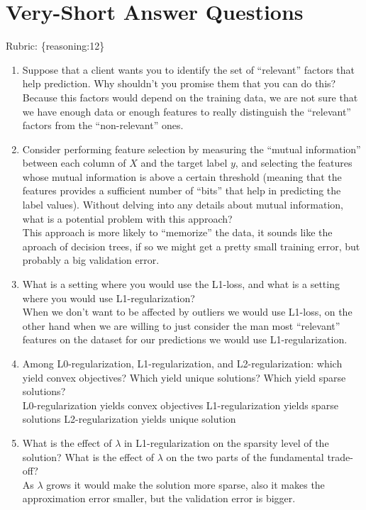 \documentclass{article}
\def\rubric#1{\gre{Rubric: \{#1\}}}{}
\def\gre#1{{\color{gre}#1}}
\def\ans#1{{\color{ans}#1}}
\def\enum#1{\begin{enumerate}#1\end{enumerate}}
\begin{document}
\section{Very-Short Answer Questions}
\rubric{reasoning:12}


\enum{
\item Suppose that a client wants you to identify the set of ``relevant'' factors that help prediction. Why shouldn't you promise them that you can do this? \\
\ans{
    Because this factors would depend on the training data, we are not sure that we have enough data or 
    enough features to really distinguish the ``relevant'' factors from the ``non-relevant'' ones.
}
\item Consider performing feature selection by measuring the ``mutual information'' between each column of $X$ and the target label $y$, and selecting the features whose mutual information is above a certain threshold (meaning that the features provides a sufficient number of ``bits'' that help in predicting the label values). Without delving into any details about mutual information, what is a potential problem with this approach? \\
\ans{
    This approach is more likely to ``memorize'' the data, it sounds like the aproach of decision trees, 
    if so we might get a pretty small training error, but probably a big validation error.
}
\item What is a setting where you would use the L1-loss, and what is a setting where you would use L1-regularization? \\
\ans{
    When we don't want to be affected by outliers we would use L1-loss, on the other hand when we 
    are willing to just consider the man most ``relevant'' features on the dataset for our predictions 
    we would use L1-regularization.
}
\item Among L0-regularization, L1-regularization, and L2-regularization: which yield convex objectives? Which yield unique solutions? Which yield sparse solutions? \\
\ans{
    L0-regularization yields convex objectives
    L1-regularization yields sparse solutions
    L2-regularization yields unique solution
}
\item What is the effect of $\lambda$ in L1-regularization on the sparsity level of the solution? What is the effect of $\lambda$ on the two parts of the fundamental trade-off? \\
\ans{
    As $\lambda$ grows it would make the solution more sparse, also it makes the approximation error smaller, but the validation error is bigger.
}}
\end{document}
